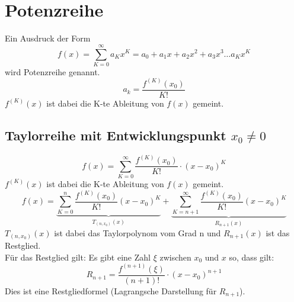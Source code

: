 



\section{Potenzreihe}
Ein Ausdruck der Form 
\[ \boxed{f(x) = \sum_{K = 0}^{\infty} a_K x^K 
= a_0 + a_1 x + a_2 x^2 + a_3 x^3 \dots a_K x^K} \]
wird Potenzreihe genannt. 
\[ \boxed{a_k = \frac{f^{(K)}(x_0)}{K!}} \]
$f^{(K)}(x)$ ist dabei die K-te Ableitung von $f(x)$ gemeint. 

\subsection{Taylorreihe mit Entwicklungspunkt $x_0 \neq 0$}
\[ \boxed{f(x) = \sum_{K=0}^{\infty}\frac{f^{(K)}(x_0)}{K!}\cdot (x-x_0)^K} \]
$f^{(K)}(x)$ ist dabei die K-te Ableitung von $f(x)$ gemeint. 
\[ \boxed{f(x) = \underbrace{\sum_{K=0}^{n}\frac{f^{(K)}(x_0)}
{K!} (x - x_0)^K}_{T_{(n,x_0)}(x)} + \underbrace{\sum_{K=n+1}^{\infty}
\frac{f^{(K)}(x_0)}{K!} (x - x_0)^K}_{R_{n+1}(x)}} \]
$T_{(n,x_0)}(x)$ ist dabei das Taylorpolynom vom Grad n und $R_{n+1}(x)$ ist 
das Restglied. \\
Für das Restglied gilt: Es gibt eine Zahl $\xi$ zwischen $x_0$ und $x$ so, dass 
gilt:
\[ \boxed{R_{n+1} = \frac{f^{(n + 1)}(\xi)}{(n + 1)!} \cdot (x - x_0)^{n + 1}}\]
Dies ist eine Restgliedformel (Lagrangsche Darstellung für $R_{n + 1}$).

